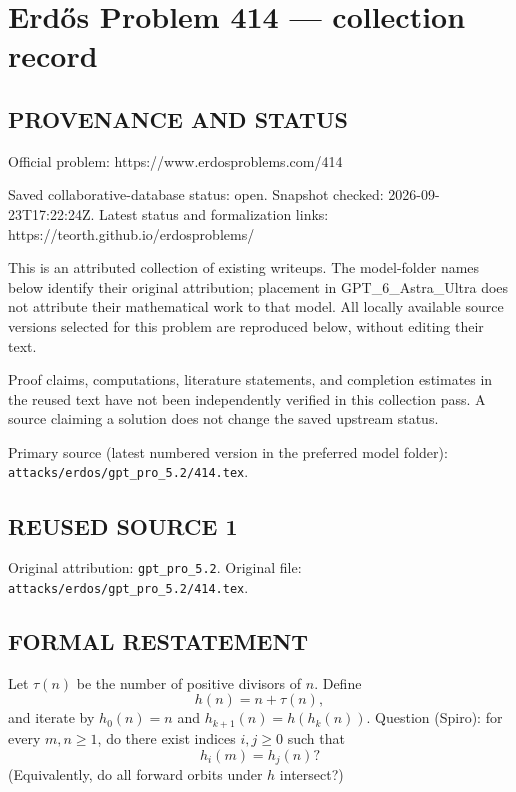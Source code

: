 \section*{Erd\H{o}s Problem 414 --- collection record}

\subsection*{PROVENANCE AND STATUS}
Official problem: https://www.erdosproblems.com/414

Saved collaborative-database status: open.
Snapshot checked: 2026-09-23T17:22:24Z.
Latest status and formalization links: https://teorth.github.io/erdosproblems/

This is an attributed collection of existing writeups. The model-folder names below identify their original attribution; placement in GPT\_6\_Astra\_Ultra does not attribute their mathematical work to that model. All locally available source versions selected for this problem are reproduced below, without editing their text.

Proof claims, computations, literature statements, and completion estimates in the reused text have not been independently verified in this collection pass. A source claiming a solution does not change the saved upstream status.

Primary source (latest numbered version in the preferred model folder): \texttt{attacks/erdos/gpt\_pro\_5.2/414.tex}.

\subsection*{REUSED SOURCE 1}
Original attribution: \texttt{gpt\_pro\_5.2}.
Original file: \texttt{attacks/erdos/gpt\_pro\_5.2/414.tex}.


\subsection*{FORMAL RESTATEMENT}
Let $\tau(n)$ be the number of positive divisors of $n$.
Define
$$h(n)=n+\tau(n),$$
and iterate by $h_0(n)=n$ and $h_{k+1}(n)=h(h_k(n))$.
Question (Spiro): for every $m,n\ge1$, do there exist indices $i,j\ge0$ such that
$$h_i(m)=h_j(n)?$$
(Equivalently, do all forward orbits under $h$ intersect?)

